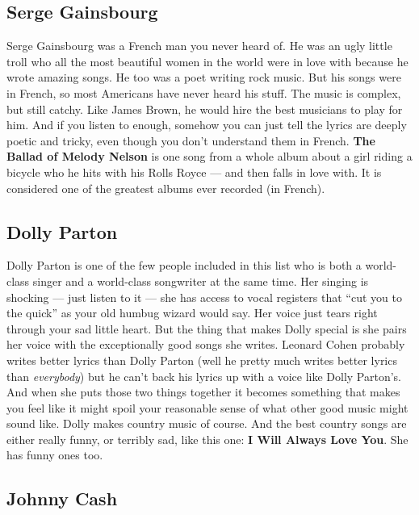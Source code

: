 \documentclass[letterpaper,]{article}
\begin{document}
\hypertarget{serge-gainsbourg}{%
\subsection{Serge Gainsbourg}\label{serge-gainsbourg}}

Serge Gainsbourg was a French man you never heard of. He was an ugly
little troll who all the most beautiful women in the world were in love
with because he wrote amazing songs. He too was a poet writing rock
music. But his songs were in French, so most Americans have never heard
his stuff. The music is complex, but still catchy. Like James Brown, he
would hire the best musicians to play for him. And if you listen to
enough, somehow you can just tell the lyrics are deeply poetic and
tricky, even though you don't understand them in French. \textbf{The
Ballad of Melody Nelson} is one song from a whole album about a girl
riding a bicycle who he hits with his Rolls Royce --- and then falls in
love with. It is considered one of the greatest albums ever recorded (in
French).

\hypertarget{dolly-parton}{%
\subsection{Dolly Parton}\label{dolly-parton}}

Dolly Parton is one of the few people included in this list who is both
a world-class singer and a world-class songwriter at the same time. Her
singing is shocking --- just listen to it --- she has access to vocal
registers that ``cut you to the quick'' as your old humbug wizard would
say. Her voice just tears right through your sad little heart. But the
thing that makes Dolly special is she pairs her voice with the
exceptionally good songs she writes. Leonard Cohen probably writes
better lyrics than Dolly Parton (well he pretty much writes better
lyrics than \emph{everybody}) but he can't back his lyrics up with a
voice like Dolly Parton's. And when she puts those two things together
it becomes something that makes you feel like it might spoil your
reasonable sense of what other good music might sound like. Dolly makes
country music of course. And the best country songs are either really
funny, or terribly sad, like this one: \textbf{I Will Always Love You}.
She has funny ones too.

\hypertarget{johnny-cash}{%
\subsection{Johnny Cash}\label{johnny-cash}}
\end{document}
